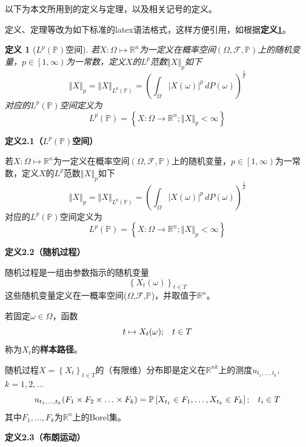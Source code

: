 \documentclass[UTF8，12pt]{ctexart}
\newtheorem{definition}[theorem]{定义}
\numberwithin{equation}{section}
\newcommand{\XW}[1]{\textcolor{sysugreen}{{#1}}}
\begin{document}
以下为本文所用到的定义与定理，以及相关记号的定义。

\XW{定义、定理等改为如下标准的latex语法格式，这样方便引用，如根据\textbf{定义\ref{def:Lp_space}}。}

\XW{
\begin{definition}[$L^p(\mathbb{P})$空间]\label{def:Lp_space}
若$X:\Omega\mapsto\mathbb{R}^n$为一定义在概率空间$(\Omega,\mathcal{F},\mathbb{P})$上的随机变量，$p\in \left [1,\infty \right )$为一常数，定义$X$的$L^p$范数$\left \Vert X \right \Vert_p$如下
\[
\left \Vert X \right \Vert_p=\left \Vert X \right \Vert_{L^p(\mathbb{P})}=(\int_{\Omega} \left \vert X(\omega) \right \vert^p \, dP(\omega))^{\frac{1}{p}}
\]
对应的$L^p(\mathbb{P})$空间定义为
\[
L^p(\mathbb{P})=\left \{ X:\Omega \to \mathbb{R}^n;\left \Vert X \right \Vert_p<\infty \right \}
\]
\end{definition}
}

\vspace{0.3cm}
\noindent \textbf{定义2.1（$L^p(\mathbb{P})$空间）}

若$X:\Omega\mapsto\mathbb{R}^n$为一定义在概率空间$(\Omega,\mathcal{F},\mathbb{P})$上的随机变量，$p\in \left [1,\infty \right )$为一常数，定义$X$的$L^p$范数$\left \Vert X \right \Vert_p$如下
\[
\left \Vert X \right \Vert_p=\left \Vert X \right \Vert_{L^p(\mathbb{P})}=(\int_{\Omega} \left \vert X(\omega) \right \vert^p \, dP(\omega))^{\frac{1}{p}}
\]
对应的$L^p(\mathbb{P})$空间定义为
\[
L^p(\mathbb{P})=\left \{ X:\Omega \to \mathbb{R}^n;\left \Vert X \right \Vert_p<\infty \right \}
\]

\vspace{0.3cm}
\noindent \textbf{定义2.2（随机过程）}

随机过程是一组由参数指示的随机变量
\[
\left \{ X_t(\omega)\right \}_{t\in T}
\]
这些随机变量定义在一概率空间($\Omega$,$\mathcal{F}$,$\mathbb{P}$)，并取值于$\mathbb{R}^n$。

若固定$\omega \in \Omega$，函数
\[
t \mapsto X_t(\omega);\hspace{0.3cm}t \in T
\]
称为$X_t$的\textbf{样本路径}。

随机过程$X=\left\{X_t\right\}_{t\in T}$的（有限维）分布即是定义在$\mathbb{R}^{nk}$上的测度$u_{t_1,\ldots,t_k},$
\noindent$k=1,2,\ldots$
\[
u_{t_1,\ldots,t_k}(F_1\times F_2\times \ldots\times F_k)=\mathbb{P}\left[X_{t_1}\in F_1,\ldots,X_{t_k}\in F_k\right];\hspace{0.3cm}t_i\in T
\]
其中$F_1,\ldots,F_k$为$\mathbb{R}^n$上的Borel集。

\vspace{0.3cm}
\noindent \textbf{定义2.3（布朗运动）}
\end{document}
